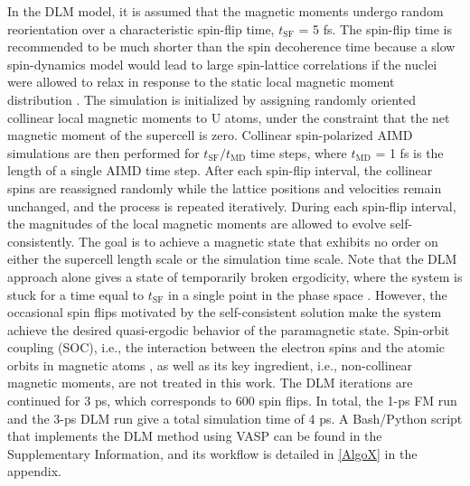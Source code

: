 \documentclass[preprint, 12pt]{elsarticle}
\newcommand{\?}{\stackrel{?}{=}}
\begin{document}
In the DLM model, it is assumed that the magnetic moments undergo random reorientation over a characteristic spin-flip time, \( t_\mathrm{SF} \) = 5 fs. The spin-flip time is recommended to be much shorter than the spin decoherence time because a slow spin-dynamics model would lead to large spin-lattice correlations if the nuclei were allowed to relax in response to the static local magnetic moment distribution \cite{Steneteg2012}. The simulation is initialized by assigning randomly oriented collinear local magnetic moments to U atoms, under the constraint that the net magnetic moment of the supercell is zero. Collinear spin-polarized AIMD simulations are then performed for \( t_\mathrm{SF} / t_\mathrm{MD} \) time steps, where \( t_\mathrm{MD} \) = 1 fs is the length of a single AIMD time step. After each spin-flip interval, the collinear spins are reassigned randomly while the lattice positions and velocities remain unchanged, and the process is repeated iteratively. During each spin-flip interval, the magnitudes of the local magnetic moments are allowed to evolve self-consistently. The goal is to achieve a magnetic state that exhibits no order on either the supercell length scale or the simulation time scale. Note that the DLM approach alone gives a state of temporarily broken ergodicity, where the system is stuck for a time equal to $t_\mathrm{SF}$ in a single point in the phase space \cite{Gyorffy1985, Abrikosov2016}. However, the occasional spin flips motivated by the self-consistent solution make the system achieve the desired quasi-ergodic behavior of the paramagnetic state. Spin-orbit coupling (SOC), i.e., the interaction between the electron spins and the atomic orbits in magnetic atoms \cite{Giustino2014}, as well as its key ingredient, i.e., non-collinear magnetic moments, are not treated in this work. The DLM iterations are continued for 3 ps, which corresponds to 600 spin flips. In total, the 1-ps FM run and the 3-ps DLM run give a total simulation time of 4 ps. A Bash/Python script that implements the DLM method using VASP can be found in the Supplementary Information, and its workflow is detailed in \cref{AlgoX} in the appendix.
\end{document}
